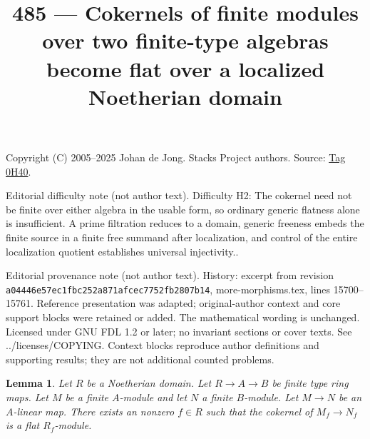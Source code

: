 \documentclass{amsart}
\theoremstyle{plain}
\newtheorem{lemma}[subsection]{Lemma}
\theoremstyle{definition}
\theoremstyle{remark}
\numberwithin{equation}{subsection}
\begin{document}
\title[Stacks Project, Tag 0H40]{485 --- Cokernels of finite modules over two finite-type algebras become flat over a localized Noetherian domain}
\maketitle
\noindent Copyright (C) 2005--2025 Johan de Jong. Stacks Project authors. Source: \href{https://stacks.math.columbia.edu/tag/0H40}{Tag 0H40}.

\noindent Editorial difficulty note (not author text). Difficulty H2: The cokernel need not be finite over either algebra in the usable form, so ordinary generic flatness alone is insufficient. A prime filtration reduces to a domain, generic freeness embeds the finite source in a finite free summand after localization, and control of the entire localization quotient establishes universal injectivity..

\noindent Editorial provenance note (not author text). History: excerpt from revision \texttt{a0444\allowbreak 6e57e\allowbreak c1fbc\allowbreak 252a8\allowbreak 71afc\allowbreak ec775\allowbreak 2fb28\allowbreak 07b14}, more-morphisms.tex, lines 15700--15761. Reference presentation was adapted; original-author context and core support blocks were retained or added. The mathematical wording is unchanged. Licensed under GNU FDL 1.2 or later; no invariant sections or cover texts. See ../licenses/COPYING. Context blocks reproduce author definitions and supporting results; they are not additional counted problems.

\begin{lemma}
\label{lemma-cokernel-flat}
Let $R$ be a Noetherian domain. Let $R \to A \to B$ be finite type ring maps.
Let $M$ be a finite $A$-module and let $N$ a finite $B$-module.
Let $M \to N$ be an $A$-linear map. There exists an nonzero $f \in R$
such that the cokernel of $M_f \to N_f$ is a flat $R_f$-module.
\end{lemma}
\end{document}
